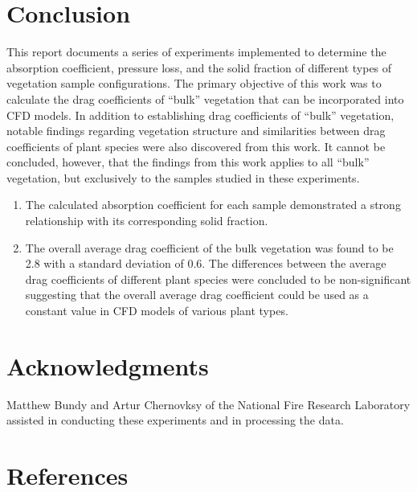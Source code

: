 \documentclass[12pt]{article}
\begin{document}
\section{Conclusion}

This report documents a series of experiments implemented to determine the absorption coefficient, pressure loss, and the solid fraction of different types of vegetation sample configurations. The primary objective of this work was to calculate the drag coefficients of ``bulk'' vegetation that can be incorporated into CFD models. In addition to establishing drag coefficients of ``bulk''  vegetation, notable findings regarding vegetation structure and similarities between drag coefficients of plant species were also discovered from this work. It cannot be concluded, however, that the findings from this work applies to all ``bulk'' vegetation, but exclusively to the samples studied in these experiments.

\begin{enumerate}
  \item The calculated absorption coefficient for each sample demonstrated a strong relationship with its corresponding solid fraction.
  \item The overall average drag coefficient of the bulk vegetation was found to be 2.8 with a standard deviation of 0.6. The differences between the average drag coefficients of different plant species were concluded to be non-significant suggesting that the overall average drag coefficient could be used as a constant value in CFD models of various plant types.
\end{enumerate}

\section*{Acknowledgments}

\noindent Matthew Bundy and Artur Chernovksy of the National Fire Research Laboratory assisted in conducting these experiments and in processing the data.   \\
\pagebreak
\section*{References}


\pagebreak
\end{document}
